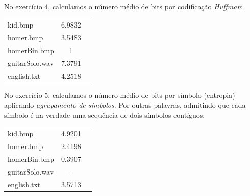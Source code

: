\documentclass[12pt]{article}
\begin{document}
  \pagebreak

  No exercício 4, calculamos o número médio de bits por codificação
  \textit{Huffman}:

  \begin{tabular}{ l c r }
    kid.bmp & 6.9832 \\
    homer.bmp & 3.5483 \\
    homerBin.bmp & 1 \\
    guitarSolo.wav & 7.3791 \\
    english.txt & 4.2518 \\
  \end{tabular}

  No exercício 5, calculamos o número médio de bits por símbolo (entropia)
  aplicando \textit{agrupamento de símbolos}. Por outras palavras, admitindo
  que cada símbolo é na verdade uma sequência de dois símbolos contíguos:

  \begin{tabular}{ l c r }
    kid.bmp & 4.9201 \\
    homer.bmp & 2.4198 \\
    homerBin.bmp & 0.3907 \\
    guitarSolo.wav & -- \\
    english.txt & 3.5713 \\
  \end{tabular}
  
\end{document}
